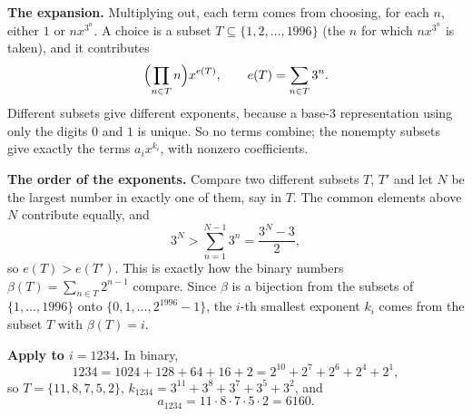 \textbf{The expansion.} Multiplying out, each term comes from choosing, for each $n$, either $1$ or $nx^{3^n}$. A choice is a subset $T\subseteq\{1,2,\dots,1996\}$ (the $n$ for which $nx^{3^n}$ is taken), and it contributes
\[
\Bigl(\prod_{n\in T}n\Bigr)x^{e(T)},\qquad e(T)=\sum_{n\in T}3^n .
\]
Different subsets give different exponents, because a base-$3$ representation using only the digits $0$ and $1$ is unique. So no terms combine; the nonempty subsets give exactly the terms $a_ix^{k_i}$, with nonzero coefficients.

\textbf{The order of the exponents.} Compare two different subsets $T$, $T'$ and let $N$ be the largest number in exactly one of them, say in $T$. The common elements above $N$ contribute equally, and
\[
3^N>\sum_{n=1}^{N-1}3^n=\dfrac{3^N-3}{2},
\]
so $e(T)>e(T')$. This is exactly how the binary numbers $\beta(T)=\sum_{n\in T}2^{n-1}$ compare. Since $\beta$ is a bijection from the subsets of $\{1,\dots,1996\}$ onto $\{0,1,\dots,2^{1996}-1\}$, the $i$-th smallest exponent $k_i$ comes from the subset $T$ with $\beta(T)=i$.

\textbf{Apply to $i=1234$.} In binary,
\[
1234=1024+128+64+16+2=2^{10}+2^7+2^6+2^4+2^1,
\]
so $T=\{11,8,7,5,2\}$, $k_{1234}=3^{11}+3^8+3^7+3^5+3^2$, and
\[
a_{1234}=11\cdot8\cdot7\cdot5\cdot2=\boxed{6160}.
\]
